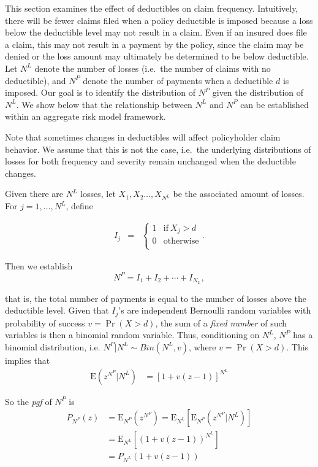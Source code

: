 \documentclass[]{book}
\theoremstyle{definition}
\theoremstyle{definition}
\theoremstyle{definition}
\theoremstyle{remark}
\begin{document}
This section examines the effect of deductibles on claim frequency.
Intuitively, there will be fewer claims filed when a policy deductible
is imposed because a loss below the deductible level may not result in a
claim. Even if an insured does file a claim, this may not result in a
payment by the policy, since the claim may be denied or the loss amount
may ultimately be determined to be below deductible. Let \(N^L\) denote
the number of losses (i.e.~the number of claims with no deductible), and
\(N^P\) denote the number of payments when a deductible \(d\) is
imposed. Our goal is to identify the distribution of \(N^P\) given the
distribution of \(N^L\). We show below that the relationship between
\(N^L\) and \(N^P\) can be established within an aggregate risk model
framework.

Note that sometimes changes in deductibles will affect policyholder
claim behavior. We assume that this is not the case, i.e.~the underlying
distributions of losses for both frequency and severity remain unchanged
when the deductible changes.

Given there are \(N^L\) losses, let \(X_1,X_2\ldots,X_{N^L}\) be the
associated amount of losses. For \(j=1,\ldots,N^L\), define

\begin{eqnarray*}
I_j&=&
\left \{
\begin{array}{cc}
1 & \text{if} ~X_j>d\\
0 & \text{otherwise}\\
\end{array}
\right..
\end{eqnarray*}

Then we establish \[N^P=I_1+I_2+\cdots+I_{N_L},\]

that is, the total number of payments is equal to the number of losses
above the deductible level. Given that \(I_j\)'s are independent
Bernoulli random variables with probability of success \(v=\Pr(X>d)\),
the sum of a \emph{fixed number} of such variables is then a binomial
random variable. Thus, conditioning on \(N^L\), \(N^P\) has a binomial
distribution, i.e. \(N^P | N^L \sim Bin(N^L, v)\), where \(v=\Pr(X>d)\).
This implies that \[\begin{aligned}
\mathrm{E}\left(z^{N^P}|N^L\right)&= \left[ 1+v(z-1)\right]^{N^L}
\end{aligned}\]

So the \emph{pgf} of \(N^P\) is \[\begin{aligned}
P_{N^P}(z)&= \mathrm{E}_{N^P}\left(z^{N^P}\right)=\mathrm{E}_{N^L}\left[\mathrm{E}_{N^P}\left(z^{N^P}|N^L\right)\right]\\
&= \mathrm{E}_{N^L}\left[(1+v(z-1))^{N^L}\right]\\
&= P_{N^L}\left(1+v(z-1)\right)
\end{aligned}\]
\end{document}
